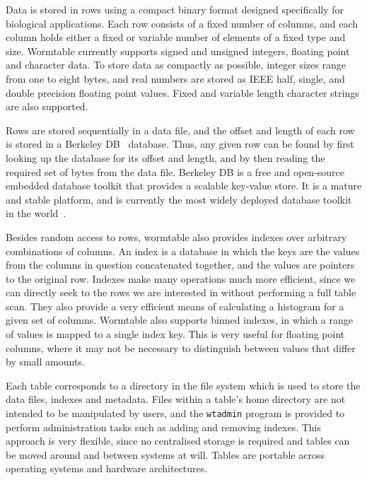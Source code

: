 \documentclass[10pt]{bmc_article}
\newenvironment{bmcformat}{\begin{raggedright}\baselineskip20pt\sloppy\setboolean{publ}{false}}{\end{raggedright}\baselineskip20pt\sloppy}
\begin{document}
\begin{bmcformat}
Data is stored in rows using a  
compact binary format designed specifically for biological applications.
Each row consists of a fixed number of columns, and each column 
holds either a fixed or variable number of elements of a fixed type and size.
Wormtable currently supports signed and unsigned integers, 
floating point and character data. To store data as 
compactly as possible, integer sizes range from one to eight bytes,
and real numbers are stored as IEEE half, single, and double 
precision floating point values. %
Fixed and variable length character strings 
are also supported. 

Rows are stored sequentially in a data file, and the offset and length 
of each row is stored in a Berkeley DB~\cite{obs99} database. 
Thus, any given row can be found 
by first looking up the database for its offset and length, and by then reading
the required set of bytes from the data file. 
Berkeley DB is a free and open-source embedded database toolkit that provides a
scalable key-value store. It is a mature and stable platform, 
and is currently the most widely deployed database toolkit in the 
world~\cite{sb12}. 

Besides random access to rows, wormtable also provides indexes
over arbitrary combinations of columns. An index is a database in 
which the keys are the values from the columns in question concatenated
together, and the values are pointers to the original row. Indexes make
many operations much more efficient, since we can directly seek to the 
rows we are interested in without performing a full table scan. They also 
provide a very efficient means of calculating a histogram for a given 
set of columns. Wormtable also supports binned indexes, in which a range of 
values is mapped to a single index key. This is very useful for floating 
point columns, where it may not be necessary to distinguish between
values that differ by small amounts.

Each table corresponds to a directory in the file system
which is used to store the data files, indexes and metadata.
Files within a table's home directory are not intended to be 
manipulated by users, and the \texttt{wtadmin} program is provided 
to perform administration tasks such as adding and removing 
indexes. This approach is 
very flexible, since no centralised storage is required and 
tables can be moved around and between systems at will.
Tables are portable across operating systems and hardware
architectures.



\end{bmcformat}
\end{document}
